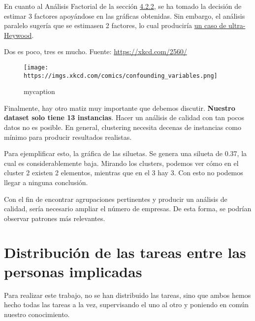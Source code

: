 \documentclass[
]{scrreprt}
\begin{document}
En cuanto al Análisis Factorial de la sección
\protect\hyperlink{Anuxe1lisisux5cux2520factorial}{4.2.2}, se ha tomado
la decisión de estimar 3 factores apoyándose en las gráficas obtenidas.
Sin embargo, el análisis paralelo sugería que se estimasen 2 factores,
lo cual produciría
\href{https://v8doc.sas.com/sashtml/stat/chap26/sect21.htm}{un caso de
ultra-Heywood}.

Dos es poco, tres es mucho. Fuente: \url{https://xkcd.com/2560/}

\begin{figure}[H]
\texttt{[image: https://imgs.xkcd.com/comics/confounding\_variables.png]}
\centering
\caption{mycaption}
\end{figure}

Finalmente, hay otro matiz muy importante que debemos discutir.
\textbf{Nuestro dataset solo tiene 13 instancias}. Hacer un análisis de
calidad con tan pocos datos no es posible. En general, clustering
necesita decenas de instancias como mínimo para producir resultados
realistas.

Para ejemplificar esto, la gráfica de las siluetas. Se genera una
silueta de 0.37, la cual es considerablemente baja. Mirando los
clusters, podemos ver cómo en el cluster 2 existen 2 elementos, mientras
que en el 3 hay 3. Con esto no podemos llegar a ninguna conclusión.

Con el fin de encontrar agrupaciones pertinentes y producir un análisis
de calidad, sería necesario ampliar el número de empresas. De esta
forma, se podrían observar patrones más relevantes.

\hypertarget{distribuciuxf3n-de-las-tareas-entre-las-personas-implicadas}{%
\chapter{Distribución de las tareas entre las personas
implicadas}\label{distribuciuxf3n-de-las-tareas-entre-las-personas-implicadas}}

Para realizar este trabajo, no se han distribuido las tareas, sino que
ambos hemos hecho todas las tareas a la vez, supervisando el uno al otro
y poniendo en común nuestro conocimiento.
\end{document}
